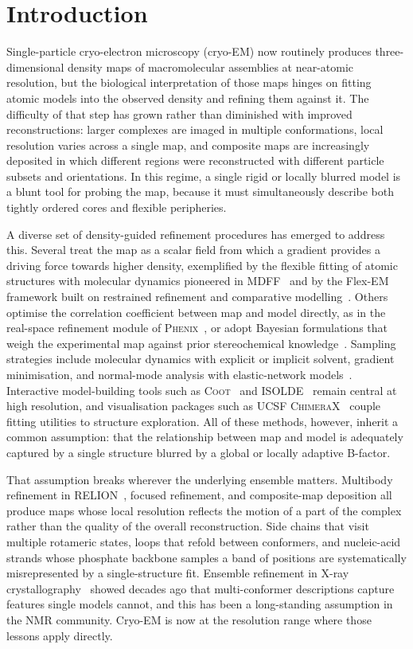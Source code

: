 \section{Introduction}
Single-particle cryo-electron microscopy (cryo-EM) now routinely produces three-dimensional density maps of macromolecular assemblies at near-atomic resolution, but the biological interpretation of those maps hinges on fitting atomic models into the observed density and refining them against it. The difficulty of that step has grown rather than diminished with improved reconstructions: larger complexes are imaged in multiple conformations, local resolution varies across a single map, and composite maps are increasingly deposited in which different regions were reconstructed with different particle subsets and orientations. In this regime, a single rigid or locally blurred model is a blunt tool for probing the map, because it must simultaneously describe both tightly ordered cores and flexible peripheries.

A diverse set of density-guided refinement procedures has emerged to address this. Several treat the map as a scalar field from which a gradient provides a driving force towards higher density, exemplified by the flexible fitting of atomic structures with molecular dynamics pioneered in MDFF~\cite{trabuco2008} and by the Flex-EM framework built on restrained refinement and comparative modelling~\cite{topf2008}. Others optimise the correlation coefficient between map and model directly, as in the real-space refinement module of \textsc{Phenix}~\cite{afonine2018,liebschner2019}, or adopt Bayesian formulations that weigh the experimental map against prior stereochemical knowledge~\cite{bonomi2018}. Sampling strategies include molecular dynamics with explicit or implicit solvent, gradient minimisation, and normal-mode analysis with elastic-network models~\cite{tama2004}. Interactive model-building tools such as \textsc{Coot}~\cite{emsley2010} and \textsc{ISOLDE}~\cite{croll2018} remain central at high resolution, and visualisation packages such as \textsc{UCSF ChimeraX}~\cite{goddard2018,pettersen2021} couple fitting utilities to structure exploration. All of these methods, however, inherit a common assumption: that the relationship between map and model is adequately captured by a single structure blurred by a global or locally adaptive B-factor.

That assumption breaks wherever the underlying ensemble matters. Multibody refinement in \textsc{RELION}~\cite{nakane2018}, focused refinement, and composite-map deposition all produce maps whose local resolution reflects the motion of a part of the complex rather than the quality of the overall reconstruction. Side chains that visit multiple rotameric states, loops that refold between conformers, and nucleic-acid strands whose phosphate backbone samples a band of positions are systematically misrepresented by a single-structure fit. Ensemble refinement in X-ray crystallography~\cite{levin2007,burnley2012} showed decades ago that multi-conformer descriptions capture features single models cannot, and this has been a long-standing assumption in the NMR community. Cryo-EM is now at the resolution range where those lessons apply directly.

